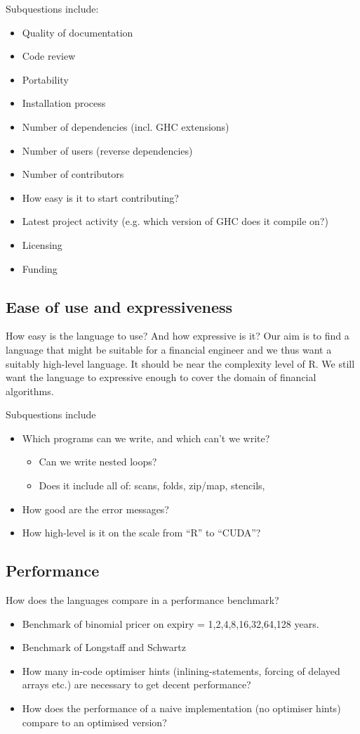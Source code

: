 Subquestions include:
\begin{itemize}
\item Quality of documentation
\item Code review
\item Portability
\item Installation process
\item Number of dependencies (incl. GHC extensions)
\item Number of users (reverse dependencies)
\item Number of contributors
\item How easy is it to start contributing?
\item Latest project activity (e.g. which version of GHC does it compile on?)
\item Licensing
\item Funding
\end{itemize}

\subsection{Ease of use and expressiveness} 

How easy is the language to use? And how expressive is it? Our
aim is to find a language that might be suitable for a financial
engineer and we thus want a suitably high-level language. It should
be near the complexity level of R. We still want the language to
expressive enough to cover the domain of financial algorithms.

Subquestions include
\begin{itemize}
\item Which programs can we write, and which can't we write?
  \begin{itemize}
  \item Can we write nested loops?
  \item Does it include all of: scans, folds, zip/map, stencils,
  \end{itemize}
\item How good are the error messages?
\item How high-level is it on the scale from ``R'' to ``CUDA''?
\end{itemize}

\subsection{Performance} How does the languages compare in a
performance benchmark?
\begin{itemize}
\item Benchmark of binomial pricer on expiry = 1,2,4,8,16,32,64,128 years.
\item Benchmark of Longstaff and Schwartz
\item How many in-code optimiser hints (inlining-statements, forcing
  of delayed arrays etc.) are necessary to get decent performance?
\item How does the performance of a naive implementation (no
  optimiser hints) compare to an optimised version?
\end{itemize}


